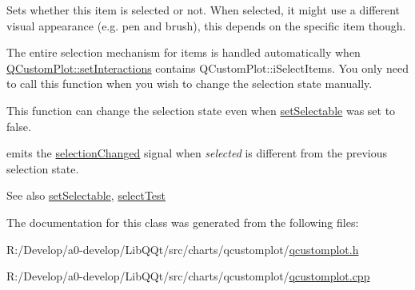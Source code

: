 Sets whether this item is selected or not. When selected, it might use a different visual appearance (e.\+g. pen and brush), this depends on the specific item though.

The entire selection mechanism for items is handled automatically when \mbox{\hyperlink{class_q_custom_plot_a5ee1e2f6ae27419deca53e75907c27e5}{Q\+Custom\+Plot\+::set\+Interactions}} contains Q\+Custom\+Plot\+::i\+Select\+Items. You only need to call this function when you wish to change the selection state manually.

This function can change the selection state even when \mbox{\hyperlink{class_q_c_p_abstract_item_a8a8e32a55bc478b849756a78c2d87fd2}{set\+Selectable}} was set to false.

emits the \mbox{\hyperlink{class_q_c_p_abstract_item_aa5cffb034fc65dbb91c77e02c1c14251}{selection\+Changed}} signal when {\itshape selected} is different from the previous selection state.

\begin{DoxySeeAlso}{See also}
\mbox{\hyperlink{class_q_c_p_abstract_item_a8a8e32a55bc478b849756a78c2d87fd2}{set\+Selectable}}, \mbox{\hyperlink{class_q_c_p_abstract_item_a96d522d10ffc0413b9a366c6f7f0476b}{select\+Test}} 
\end{DoxySeeAlso}


The documentation for this class was generated from the following files\+:\begin{DoxyCompactItemize}
\item 
R\+:/\+Develop/a0-\/develop/\+Lib\+Q\+Qt/src/charts/qcustomplot/\mbox{\hyperlink{qcustomplot_8h}{qcustomplot.\+h}}\item 
R\+:/\+Develop/a0-\/develop/\+Lib\+Q\+Qt/src/charts/qcustomplot/\mbox{\hyperlink{qcustomplot_8cpp}{qcustomplot.\+cpp}}\end{DoxyCompactItemize}
